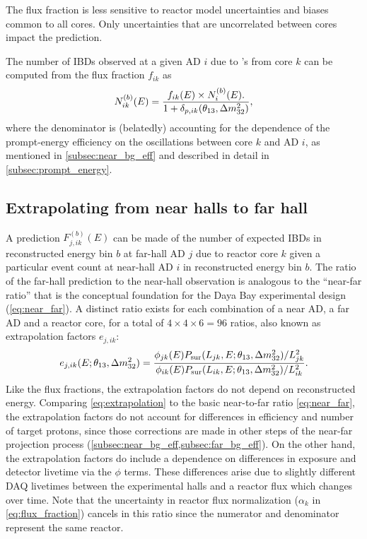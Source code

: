 The flux fraction is less sensitive to reactor \nuebar{} model uncertainties and biases
common to all cores.
Only uncertainties that are uncorrelated between cores
impact the prediction.

The number of IBDs observed at a given AD $i$ due to \nuebar{}'s from core $k$
can be computed from the flux fraction $f_{ik}$ as
\begin{equation}\label{eq:num_ibds_from_core_ij}
    N_{ik}^{(b)}(E) = \frac{
        f_{ik}(E) \times N_i^{(b)}(E).
    }{
        1 + \delta_{p,ik}(\theta_{13}, \Delta m^2_{32})
    },
\end{equation}
where the denominator is (belatedly) accounting for the dependence
of the prompt-energy efficiency on the \nuebar{} oscillations
between core $k$ and AD $i$,
as mentioned in \cref{subsec:near_bg_eff}
and described in detail in \cref{subsec:prompt_energy}.

\subsection{Extrapolating from near halls to far hall}
\label{subsec:extrapolation}

A prediction $F_{j,ik}^{(b)}(E)$ can be made of the number of expected IBDs
in reconstructed energy bin $b$
at far-hall AD $j$ due to reactor core $k$
given a particular event count at near-hall AD $i$ in reconstructed energy bin $b$.
The ratio of the far-hall prediction to the near-hall observation
is analogous to the ``near-far ratio''
that is the conceptual foundation
for the Daya Bay experimental design (\cref{eq:near_far}).
A distinct ratio exists for each combination of a near AD, a far AD and a reactor core,
for a total of $4 \times 4 \times 6 = 96$ ratios, also known as extrapolation factors
$e_{j,ik}$:
\begin{equation}\label{eq:extrapolation}
    e_{j,ik}(E;\theta_{13},\Delta m^2_{32}) = \frac{
        \phi_{jk}(E)P_\text{sur}(L_{jk}, E;\theta_{13},\Delta m^2_{32})/L_{jk}^2}{
        \phi_{ik}(E)P_\text{sur}(L_{ik}, E;\theta_{13},\Delta m^2_{32})/L_{ik}^2
    }.
\end{equation}
Like the flux fractions, the extrapolation factors
do not depend on reconstructed energy.
Comparing \cref{eq:extrapolation} to the basic near-to-far ratio \cref{eq:near_far}, the extrapolation factors
do not account for differences in efficiency and number of target protons,
since those corrections are made in other steps of the near-far projection process
(\cref{subsec:near_bg_eff,subsec:far_bg_eff}).
On the other hand, the extrapolation factors do include a dependence on
differences in \nuebar{} exposure and detector livetime via the $\phi$ terms.
These differences arise due to slightly different DAQ livetimes
between the experimental halls
and a reactor flux which changes over time.
Note that the uncertainty in reactor flux normalization
($\alpha_k$ in \cref{eq:flux_fraction})
cancels in this ratio since the numerator and denominator represent the same reactor.

